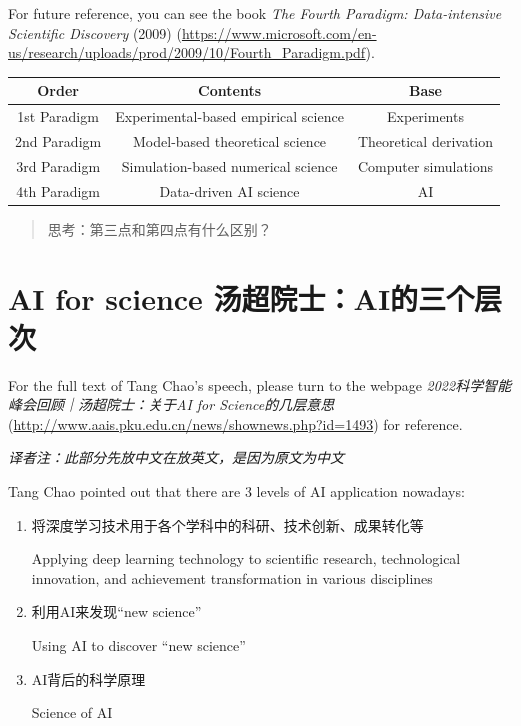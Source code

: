 For future reference, you can see the book
\emph{The Fourth Paradigm: Data-intensive Scientific Discovery} (2009) (\url{https://www.microsoft.com/en-us/research/uploads/prod/2009/10/Fourth_Paradigm.pdf}).

\begin{center}
    \begin{tabular}{|c|c|c|}
        \hline
        \textbf{Order} & \textbf{Contents} & \textbf{Base} \\
        \hline
        1st Paradigm & Experimental-based empirical science & Experiments \\
        \hline
        2nd Paradigm & Model-based theoretical science & Theoretical derivation \\
        \hline
        3rd Paradigm & Simulation-based numerical science & Computer simulations \\
        \hline
        4th Paradigm & Data-driven AI science & AI \\
        \hline
    \end{tabular}
\end{center}

\begin{quote}
思考：第三点和第四点有什么区别？
\end{quote}

\section{AI for science
汤超院士：AI的三个层次}\label{ai-for-science-ux6c64ux8d85ux9662ux58ebaiux7684ux4e09ux4e2aux5c42ux6b21}

For the full text of Tang Chao's speech, please turn to the webpage \emph{2022科学智能峰会回顾｜汤超院士：关于AI for Science的几层意思} (\url{http://www.aais.pku.edu.cn/news/shownews.php?id=1493}) for reference.

\emph{译者注：此部分先放中文在放英文，是因为原文为中文}

Tang Chao pointed out that there are 3 levels of AI application
nowadays:

\begin{enumerate}
\def\labelenumi{\arabic{enumi}.}
\item
  将深度学习技术用于各个学科中的科研、技术创新、成果转化等

  Applying deep learning technology to scientific research,
  technological innovation, and achievement transformation in various
  disciplines
\item
  利用AI来发现``new science''

  Using AI to discover ``new science''
\item
  AI背后的科学原理

  Science of AI
\end{enumerate}

